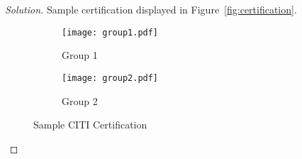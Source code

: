 \documentclass[12pt]{article}
\newenvironment{solution}
  {\begin{proof}[Solution]}
  {\end{proof}}
\begin{document}
\begin{solution}
Sample certification displayed in Figure~\ref{fig:certification}.




\begin{figure}[h]
\begin{subfigure}[b]{0.5\textwidth}
\texttt{[image: group1.pdf]}
\caption{Group 1}
\end{subfigure}
\begin{subfigure}[b]{0.5\textwidth}
\texttt{[image: group2.pdf]}
\caption{Group 2}
\end{subfigure}
\caption{Sample CITI Certification}
\end{figure}
\label{fig:certification}
\end{solution}
\end{document}

